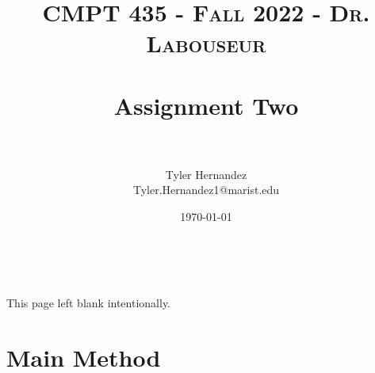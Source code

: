 \documentclass[letterpaper, 10pt,DIV=13]{scrartcl}
\title{	
   \normalfont \normalsize 
   \textsc{CMPT 435 - Fall 2022 - Dr. Labouseur} \\[10pt] %
   \horrule{0.5pt} \\[0.25cm] 	%
   \huge Assignment Two  \\     	    %
   \horrule{0.5pt} \\[0.25cm] 	%
}
\author{Tyler Hernandez \\ \normalsize Tyler.Hernandez1@marist.edu}
\date{\normalsize\today} 	%
\numberwithin{equation}{section} %
\numberwithin{figure}{section} %
\numberwithin{table}{section} %
\begin{document}
\maketitle %

\ 
\ 
\ 
\begin{center}
    This page left blank intentionally.
\end{center}

\pagebreak

\section{Main Method}
\end{document}
